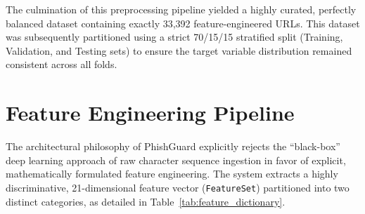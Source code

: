 The culmination of this preprocessing pipeline yielded a highly curated,
perfectly balanced dataset containing exactly 33,392 feature-engineered
URLs. This dataset was subsequently partitioned using a strict 70/15/15
stratified split (Training, Validation, and Testing sets) to ensure the
target variable distribution remained consistent across all folds.

\section{Feature Engineering
Pipeline}\label{feature-engineering-pipeline}

The architectural philosophy of PhishGuard explicitly rejects the
``black-box'' deep learning approach of raw character sequence ingestion
in favor of explicit, mathematically formulated feature engineering. The
system extracts a highly discriminative, 21-dimensional feature vector
(\texttt{FeatureSet}) partitioned into two distinct categories, as detailed in Table~\ref{tab:feature_dictionary}.


